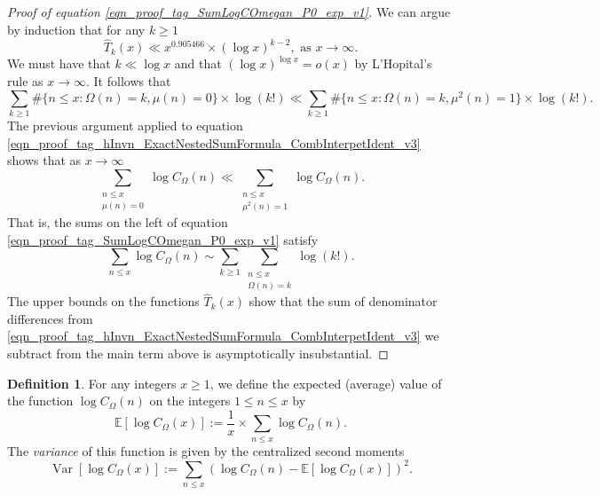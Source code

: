 \documentclass[11pt,reqno,a4letter]{article}
\numberwithin{equation}{section}
\numberwithin{figure}{section}
\numberwithin{table}{section}
\theoremstyle{plain}
\numberwithin{theorem}{section}
\theoremstyle{definition}
\newtheorem{definition}[theorem]{Definition}
\begin{document}
\begin{proof}[Proof of equation \eqref{eqn_proof_tag_SumLogCOmegan_P0_exp_v1}]
We can argue by induction that for any $k \geq 1$
\[
\widehat{T}_k(x) \ll x^{0.905466} \times (\log x)^{k-2}, 
	\text{ as } x \rightarrow \infty. 
\]
We must have that $k \ll \log x$ and that 
$(\log x)^{\log x} = o\left(x\right)$ by L'Hopital's rule as 
$x \rightarrow \infty$. 
It follows that 
\[
\sum_{k \geq 1} \#\{n \leq x: \Omega(n)=k, \mu(n)=0\} \times \log(k!) \ll 
     \sum_{k \geq 1} \#\{n \leq x: \Omega(n)=k, \mu^2(n)=1\} \times \log(k!). 
\]
The previous argument applied to 
equation \eqref{eqn_proof_tag_hInvn_ExactNestedSumFormula_CombInterpetIdent_v3} 
shows that as $x \rightarrow \infty$ 
\[
\sum_{\substack{n \leq x \\ \mu(n)=0}} \log C_{\Omega}(n) \ll 
     \sum_{\substack{n \leq x \\ \mu^2(n)=1}} \log C_{\Omega}(n). 
\]
That is, the sums on the left of 
equation \eqref{eqn_proof_tag_SumLogCOmegan_P0_exp_v1} satisfy 
\[
\sum_{n \leq x} \log C_{\Omega}(n) \sim \sum_{k \geq 1} \sum_{\substack{n \leq x \\ \Omega(n)=k}} \log(k!). 
\]
The upper bounds on the functions $\widehat{T}_k(x)$ show that 
the sum of denominator differences from 
\eqref{eqn_proof_tag_hInvn_ExactNestedSumFormula_CombInterpetIdent_v3} we subtract from the 
main term above is asymptotically insubstantial. 
\end{proof}

\begin{definition}
\label{def_AvgOrder_FirstAndSecondMomentsOfFuncs_v1}
For any integers $x \geq 1$, we define the expected (average) value of the 
function $\log C_{\Omega}(n)$ on the integers $1 \leq n \leq x$ by 
\[
\mathbb{E}\left[\log C_{\Omega}(x)\right] := \frac{1}{x} \times \sum_{n \leq x} 
     \log C_{\Omega}(n). 
\]
The \emph{variance} of this function is given by the 
centralized second moments 
\[
\operatorname{Var}\left[\log C_{\Omega}(x)\right] := 
	\sum_{n \leq x} \left(\log C_{\Omega}(n) - 
	\mathbb{E}\left[\log C_{\Omega}(x)\right]\right)^2. 
\]
\end{definition}
\end{document}

